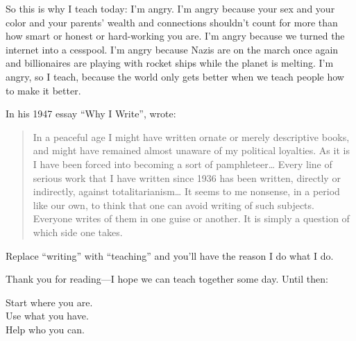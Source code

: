 So this is why I teach today:
I'm angry.
I'm angry because your sex and your color and your parents' wealth and connections
shouldn't count for more than how smart or honest or hard-working you are.
I'm angry because we turned the internet into a cesspool.
I'm angry because Nazis are on the march once again
and billionaires are playing with rocket ships while the planet is melting.
I'm angry,
so I teach,
because the world only gets better when we teach people how to make it better.

In his 1947 essay ``Why I Write'',
 wrote:

\begin{quote}

  In a peaceful age I might have written ornate or merely descriptive books,
  and might have remained almost unaware of my political loyalties.
  As it is I have been forced into becoming a sort of pamphleteer{\ldots}
  Every line of serious work that I have written since 1936 has been written,
  directly or indirectly,
  against totalitarianism{\ldots}
  It seems to me nonsense,
  in a period like our own,
  to think that one can avoid writing of such subjects.
  Everyone writes of them in one guise or another.
  It is simply a question of which side one takes.

\end{quote}

\noindent
Replace ``writing'' with ``teaching'' and you'll have the reason I do what I do.

\vspace{\baselineskip}

\noindent
Thank you for reading---I hope we can teach together some day.
Until then:

\begin{center}

Start where you are.\\
Use what you have.\\
Help who you can.

\end{center}
